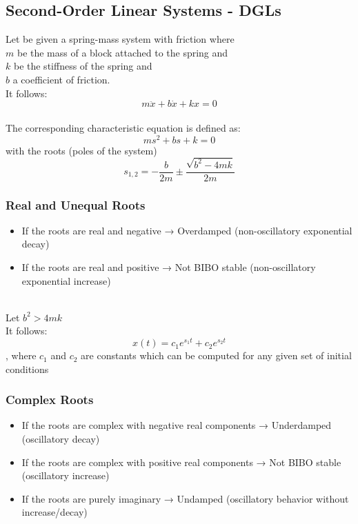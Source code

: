 \documentclass[10pt,a4paper]{article}
\begin{document}
\subsection{Second-Order Linear Systems - DGLs}

Let be given a spring-mass system with friction where \\
$m$ be the mass of a block attached to the spring and \\
$k$ be the stiffness of the spring and \\
$b$ a coefficient of friction. \\
It follows:
$$
m\ddot x + b \dot x + k x = 0
$$
\\

The corresponding characteristic equation is defined as:
$$
ms^2 + bs + k = 0
$$
with the roots (poles of the system)
$$
s_{1,2} = - \frac{b}{2m} \pm \frac{\sqrt{b^2 - 4mk}}{2m}
$$

\subsubsection{Real and Unequal Roots}
\begin{itemize}
	\item If the roots are real and negative → Overdamped (non-oscillatory exponential decay)
	\item If the roots are real and positive → Not BIBO stable (non-oscillatory exponential increase)
\end{itemize}
~\\

Let $b^2 > 4mk$ \\
It follows:
$$
x(t) = c_1e^{s_1t} + c_2e^{s_2t}
$$
, where $c_1$ and $c_2$ are constants which can be computed for any given set of initial conditions

\subsubsection{Complex Roots}
\begin{itemize}
	\item If the roots are complex with negative real components → Underdamped (oscillatory decay)
	\item If the roots are complex with positive real components → Not BIBO stable (oscillatory increase)
	\item If the roots are purely imaginary → Undamped (oscillatory behavior without increase/decay)
\end{itemize}
~\\
\end{document}
